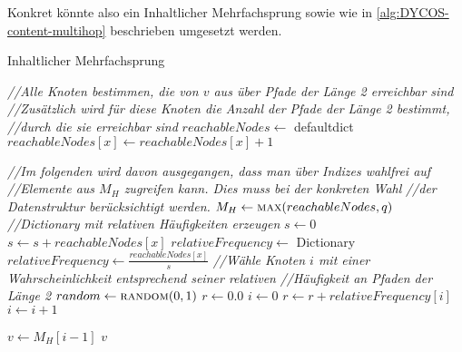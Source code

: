 Konkret könnte also ein Inhaltlicher Mehrfachsprung sowie wie in
\cref{alg:DYCOS-content-multihop} beschrieben umgesetzt werden.

\begin{algorithm}
  \caption{Inhaltlicher Mehrfachsprung}
  \label{alg:DYCOS-content-multihop}
    \begin{algorithmic}[1]
            \State \textit{//Alle Knoten bestimmen, die von $v$ aus über Pfade der Länge 2 erreichbar sind}
            \State \textit{//Zusätzlich wird für diese Knoten die Anzahl der Pfade der Länge 2 bestimmt,}
            \State \textit{//durch die sie erreichbar sind}
            \State $reachableNodes \gets$ defaultdict
                    \State $reachableNodes[x] \gets reachableNodes[x] + 1$
                \EndFor
            \EndFor

            \State \textit{//Im folgenden wird davon ausgegangen, dass man über Indizes wahlfrei auf}
            \State \textit{//Elemente aus $M_H$ zugreifen kann. Dies muss bei der konkreten Wahl}
            \State \textit{//der Datenstruktur berücksichtigt werden.}
            \State $M_H \gets \Call{max}{reachableNodes, q}$ 
            \State \textit{//Dictionary mit relativen Häufigkeiten erzeugen}
            \State $s \gets 0$
                \State $s \gets s + reachableNodes[x]$
            \EndFor
            \State $relativeFrequency \gets $ Dictionary
                \State $relativeFrequency \gets \frac{reachableNodes[x]}{s}$
            \EndFor
            \State \textit{//Wähle Knoten $i$ mit einer Wahrscheinlichkeit entsprechend seiner relativen}
            \State \textit{//Häufigkeit an Pfaden der Länge 2}
            \State $random \gets \Call{random}{0, 1}$
            \State $r \gets 0.0$
            \State $i \gets 0$
                \State $r \gets r + relativeFrequency[i]$
                \State $i \gets i + 1$
            \EndWhile
            
            \State $v \gets M_H[i-1]$ 
            \State \Return $v$
        \EndProcedure
    \end{algorithmic}
\end{algorithm}
